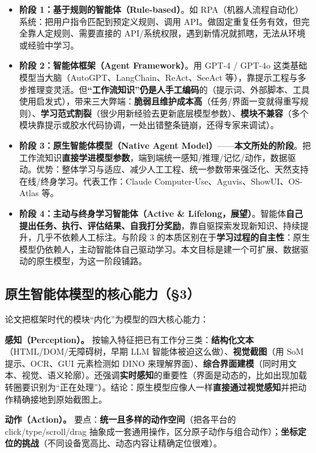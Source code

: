 \documentclass[11pt,UTF8,fontset=fandol]{ctexart}
\begin{document}
\begin{itemize}[leftmargin=1.5em]
\item \textbf{阶段 1：基于规则的智能体（Rule-based）}。如 RPA（机器人流程自动化）系统：把用户指令匹配到预定义规则、调用 API。做固定重复任务有效，但完全靠人定规则、需要直接的 API/系统权限，遇到新情况就抓瞎，无法从环境或经验中学习。
\item \textbf{阶段 2：智能体框架（Agent Framework）}。用 GPT-4 / GPT-4o 这类基础模型当大脑（AutoGPT、LangChain、ReAct、SeeAct 等），靠提示工程与多步推理变灵活。但\textbf{“工作流知识”仍是人手工编码}的（提示词、外部脚本、工具使用启发式），带来三大弊端：\textbf{脆弱且维护成本高}（任务/界面一变就得重写规则）、\textbf{学习范式割裂}（很少用新经验去更新底层模型参数）、\textbf{模块不兼容}（多个模块靠提示或胶水代码协调，一处出错整条链崩，还得专家来调试）。
\item \textbf{阶段 3：原生智能体模型（Native Agent Model）}——\textbf{本文所处的阶段}。把工作流知识\textbf{直接学进模型参数}，端到端统一感知/推理/记忆/动作，数据驱动。优势：整体学习与适应、减少人工工程、统一参数带来强泛化、天然支持在线/终身学习。代表工作：Claude Computer-Use、Aguvis、ShowUI、OS-Atlas 等。
\item \textbf{阶段 4：主动与终身学习智能体（Active \& Lifelong，展望）}。智能体\textbf{自己提出任务、执行、评估结果、自我打分奖励}，靠自驱探索发现新知识、持续提升，几乎不依赖人工标注。与阶段 3 的本质区别在于\textbf{学习过程的自主性}：原生模型仍依赖人，主动智能体自己驱动学习。本文目标是建一个可扩展、数据驱动的原生模型，为这一阶段铺路。
\end{itemize}

\subsection{原生智能体模型的核心能力（§3）}

论文把框架时代的模块“内化”为模型的四大核心能力：

\textbf{感知（Perception）。} 按输入特征把已有工作分三类：\textbf{结构化文本}（HTML/DOM/无障碍树，早期 LLM 智能体被迫这么做）、\textbf{视觉截图}（用 SoM 提示、OCR、GUI 元素检测如 DINO 来理解界面）、\textbf{综合界面建模}（同时用文本、视觉、语义轮廓）。还强调\textbf{实时感知}的重要性（界面是动态的，比如出现加载转圈要识别为“正在处理”）。结论：原生模型应像人一样\textbf{直接通过视觉感知}并把动作精确接地到原始截图上。

\textbf{动作（Action）。} 要点：\textbf{统一且多样的动作空间}（把各平台的 click/type/scroll/drag 抽象成一套通用操作，区分原子动作与组合动作）；\textbf{坐标定位的挑战}（不同设备宽高比、动态内容让精确定位很难）。
\end{document}
